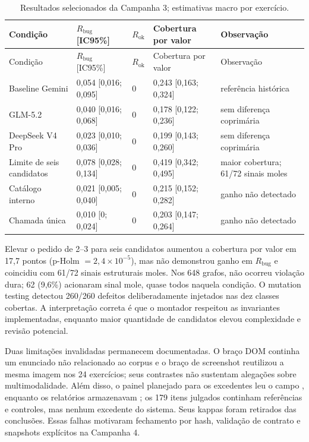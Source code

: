 \documentclass[11pt,a4paper]{article}
\newcommand{\Rbug}{\ensuremath{R_{\mathrm{bug}}}}
\newcommand{\Rok}{\ensuremath{R_{\mathrm{ok}}}}
\begin{document}
\begingroup
\footnotesize
\setlength{\tabcolsep}{3pt}
\begin{longtable}{@{}P{4.1cm}C{2.55cm}C{2.25cm}C{2.55cm}P{2.5cm}@{}}
\caption{Resultados selecionados da Campanha 3; estimativas macro por exercício.}\label{tab:c3}\\
\toprule
Condição & \Rbug{} [IC95\%] & \Rok{} & Cobertura por valor & Observação \\
\midrule
\endfirsthead
\toprule
Condição & \Rbug{} [IC95\%] & \Rok{} & Cobertura por valor & Observação \\
\midrule
\endhead
Baseline Gemini & 0,054 [0,016; 0,095] & 0 & 0,243 [0,163; 0,324] & referência histórica \\
GLM-5.2 & 0,040 [0,016; 0,068] & 0 & 0,178 [0,122; 0,236] & sem diferença coprimária \\
DeepSeek V4 Pro & 0,023 [0,010; 0,036] & 0 & 0,199 [0,143; 0,260] & sem diferença coprimária \\
Limite de seis candidatos & 0,078 [0,028; 0,134] & 0 & 0,419 [0,342; 0,495] & maior cobertura; 61/72 sinais moles \\
Catálogo interno & 0,021 [0,005; 0,040] & 0 & 0,215 [0,152; 0,282] & ganho não detectado \\
Chamada única & 0,010 [0; 0,024] & 0 & 0,203 [0,147; 0,264] & ganho não detectado \\
\bottomrule
\end{longtable}
\endgroup

Elevar o pedido de 2--3 para seis candidatos aumentou a cobertura por valor em 17,7 pontos (p-Holm $=2,4\times10^{-5}$), mas não demonstrou ganho em \Rbug{} e coincidiu com 61/72 sinais estruturais moles. Nos 648 grafos, não ocorreu violação dura; 62 (9,6\%) acionaram sinal mole, quase todos naquela condição. O mutation testing detectou 260/260 defeitos deliberadamente injetados nas dez classes cobertas. A interpretação correta é que o montador respeitou as invariantes implementadas, enquanto maior quantidade de candidatos elevou complexidade e revisão potencial.

Duas limitações invalidadas permanecem documentadas. O braço DOM continha um enunciado não relacionado ao corpus e o braço de screenshot reutilizou a mesma imagem nos 24 exercícios; seus contrastes não sustentam alegações sobre multimodalidade. Além disso, o painel planejado para os excedentes leu o campo , enquanto os relatórios armazenavam ; os 179 itens julgados continham referências e controles, mas nenhum excedente do sistema. Seus kappas foram retirados das conclusões. Essas falhas motivaram fechamento por hash, validação de contrato e snapshots explícitos na Campanha 4.
\end{document}
